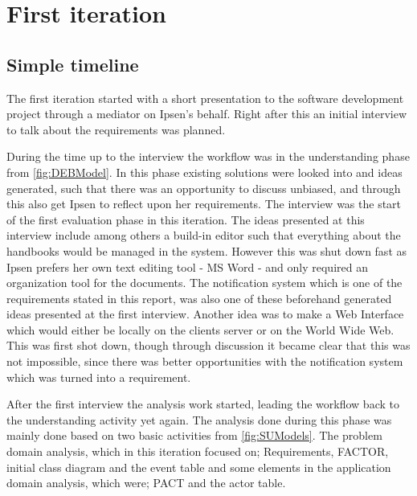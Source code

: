 \section{First iteration}\label{sec:Iteration1}
\subsection{Simple timeline}\label{sec:1-simpleTime}
The first iteration started with a short presentation to the software development project through a mediator on Ipsen's behalf.
Right after this an initial interview to talk about the requirements was planned.

During the time up to the interview the workflow was in the understanding phase from \cref{fig:DEBModel}.
In this phase existing solutions were looked into and ideas generated, such that there was an opportunity to discuss unbiased, and through this also get Ipsen to reflect upon her requirements.
The interview was the start of the first evaluation phase in this iteration.
The ideas presented at this interview include among others a build-in editor such that everything about the handbooks would be managed in the system.
However this was shut down fast as Ipsen prefers her own text editing tool - MS Word - and only required an organization tool for the documents.
The notification system which is one of the requirements stated in this report, was also one of these beforehand generated ideas presented at the first interview. 
Another idea was to make a Web Interface which would either be locally on the clients server or on the World Wide Web. This was first shot down, though through discussion it became clear that this was not impossible, since there was better opportunities with the notification system which was turned into a requirement.

After the first interview the analysis work started, leading the workflow back to the understanding activity yet again.
The analysis done during this phase was mainly done based on two basic activities from \cref{fig:SUModels}.
The problem domain analysis, which in this iteration focused on; Requirements, FACTOR, initial class diagram and the event table and some elements in the application domain analysis, which were; PACT and the actor table.

